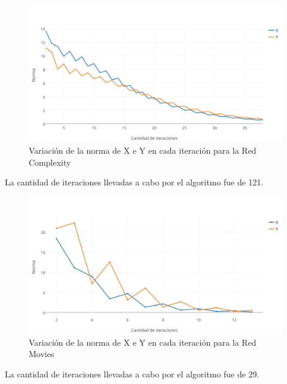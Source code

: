 \documentclass[a4paper]{article}
\begin{document}
\begin{figure}[h!]
  \begin{center}
	\includegraphics[scale=0.50]{imagenes/exp12/complexityHITS.png}
	\caption{Variaci\'on de la norma de X e Y en cada iteraci\'on para la Red Complexity}
	\label{nombreparareferenciar}
  \end{center}
\end{figure}
La cantidad de iteraciones llevadas a cabo por el algoritmo fue de 121.\\



\begin{figure}[h!]
  \begin{center}
	\includegraphics[scale=0.50]{imagenes/exp12/moviesHITS.png}
	\caption{Variaci\'on de la norma de X e Y en cada iteraci\'on para la Red Movies}
	\label{nombreparareferenciar}
  \end{center}
\end{figure}
La cantidad de iteraciones llevadas a cabo por el algoritmo fue de 29.\\
\end{document}
